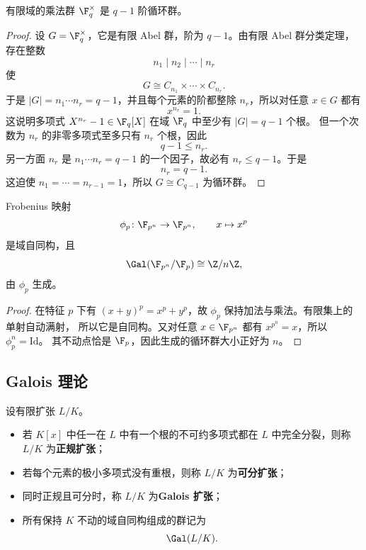 \begin{theorem}
有限域的乘法群 $\F_q^\times$ 是 $q-1$ 阶循环群。
\end{theorem}

\begin{proof}
设 $G=\F_q^\times$，它是有限 Abel 群，阶为 $q-1$。由有限 Abel 群分类定理，存在整数
\[
  n_1\mid n_2\mid \cdots \mid n_r
\]
使
\[
  G\cong C_{n_1}\times \cdots \times C_{n_r}.
\]
于是 $|G|=n_1\cdots n_r=q-1$，并且每个元素的阶都整除 $n_r$，所以对任意 $x\in G$ 都有
\[
  x^{n_r}=1.
\]
这说明多项式 $X^{n_r}-1\in \F_q[X]$ 在域 $\F_q$ 中至少有 $|G|=q-1$ 个根。
但一个次数为 $n_r$ 的非零多项式至多只有 $n_r$ 个根，因此
\[
  q-1\le n_r.
\]
另一方面 $n_r$ 是 $n_1\cdots n_r=q-1$ 的一个因子，故必有 $n_r\le q-1$。于是
\[
  n_r=q-1.
\]
这迫使 $n_1=\cdots=n_{r-1}=1$，所以 $G\cong C_{q-1}$ 为循环群。
\end{proof}

\begin{proposition}
Frobenius 映射
\begin{equation}
  \phi_p\colon \F_{p^n}\to \F_{p^n},
  \qquad x\mapsto x^p
\end{equation}
是域自同构，且
\begin{equation}
  \Gal(\F_{p^n}/\F_p)\cong \Z/n\Z,
\end{equation}
由 $\phi_p$ 生成。
\end{proposition}

\begin{proof}
在特征 $p$ 下有 $(x+y)^p=x^p+y^p$，故 $\phi_p$ 保持加法与乘法。有限集上的单射自动满射，
所以它是自同构。又对任意 $x\in\F_{p^n}$ 都有 $x^{p^n}=x$，所以 $\phi_p^n=\mathrm{Id}$。
其不动点恰是 $\F_p$，因此生成的循环群大小正好为 $n$。
\end{proof}

\subsection{Galois 理论}

\begin{definition}[正规、可分、Galois]
设有限扩张 $L/K$。
\begin{itemize}
  \item 若 $K[x]$ 中任一在 $L$ 中有一个根的不可约多项式都在 $L$ 中完全分裂，则称 $L/K$ 为\textbf{正规扩张}；
  \item 若每个元素的极小多项式没有重根，则称 $L/K$ 为\textbf{可分扩张}；
  \item 同时正规且可分时，称 $L/K$ 为\textbf{Galois 扩张}；
  \item 所有保持 $K$ 不动的域自同构组成的群记为
  \[
    \Gal(L/K).
  \]
\end{itemize}
\end{definition}


